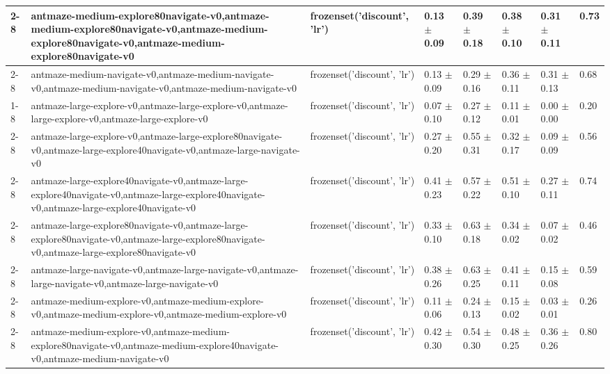 \begin{tabular}{llllllll}
\cline{2-8}
 & antmaze-medium-explore80navigate-v0,antmaze-medium-explore80navigate-v0,antmaze-medium-explore80navigate-v0,antmaze-medium-explore80navigate-v0 & frozenset({'discount', 'lr'}) & 0.13 $\pm$ 0.09 & 0.39 $\pm$ 0.18 & 0.38 $\pm$ 0.10 & 0.31 $\pm$ 0.11 & 0.73 \\
\cline{2-8}
 & antmaze-medium-navigate-v0,antmaze-medium-navigate-v0,antmaze-medium-navigate-v0,antmaze-medium-navigate-v0 & frozenset({'discount', 'lr'}) & 0.13 $\pm$ 0.09 & 0.29 $\pm$ 0.16 & 0.36 $\pm$ 0.11 & 0.31 $\pm$ 0.13 & 0.68 \\
\cline{1-8} \cline{2-8}
\multirow[t]{10}{*}{QRL} & antmaze-large-explore-v0,antmaze-large-explore-v0,antmaze-large-explore-v0,antmaze-large-explore-v0 & frozenset({'discount', 'lr'}) & 0.07 $\pm$ 0.10 & 0.27 $\pm$ 0.12 & 0.11 $\pm$ 0.01 & 0.00 $\pm$ 0.00 & 0.20 \\
\cline{2-8}
 & antmaze-large-explore-v0,antmaze-large-explore80navigate-v0,antmaze-large-explore40navigate-v0,antmaze-large-navigate-v0 & frozenset({'discount', 'lr'}) & 0.27 $\pm$ 0.20 & 0.55 $\pm$ 0.31 & 0.32 $\pm$ 0.17 & 0.09 $\pm$ 0.09 & 0.56 \\
\cline{2-8}
 & antmaze-large-explore40navigate-v0,antmaze-large-explore40navigate-v0,antmaze-large-explore40navigate-v0,antmaze-large-explore40navigate-v0 & frozenset({'discount', 'lr'}) & 0.41 $\pm$ 0.23 & 0.57 $\pm$ 0.22 & 0.51 $\pm$ 0.10 & 0.27 $\pm$ 0.11 & 0.74 \\
\cline{2-8}
 & antmaze-large-explore80navigate-v0,antmaze-large-explore80navigate-v0,antmaze-large-explore80navigate-v0,antmaze-large-explore80navigate-v0 & frozenset({'discount', 'lr'}) & 0.33 $\pm$ 0.10 & 0.63 $\pm$ 0.18 & 0.34 $\pm$ 0.02 & 0.07 $\pm$ 0.02 & 0.46 \\
\cline{2-8}
 & antmaze-large-navigate-v0,antmaze-large-navigate-v0,antmaze-large-navigate-v0,antmaze-large-navigate-v0 & frozenset({'discount', 'lr'}) & 0.38 $\pm$ 0.26 & 0.63 $\pm$ 0.25 & 0.41 $\pm$ 0.11 & 0.15 $\pm$ 0.08 & 0.59 \\
\cline{2-8}
 & antmaze-medium-explore-v0,antmaze-medium-explore-v0,antmaze-medium-explore-v0,antmaze-medium-explore-v0 & frozenset({'discount', 'lr'}) & 0.11 $\pm$ 0.06 & 0.24 $\pm$ 0.13 & 0.15 $\pm$ 0.02 & 0.03 $\pm$ 0.01 & 0.26 \\
\cline{2-8}
 & antmaze-medium-explore-v0,antmaze-medium-explore80navigate-v0,antmaze-medium-explore40navigate-v0,antmaze-medium-navigate-v0 & frozenset({'discount', 'lr'}) & 0.42 $\pm$ 0.30 & 0.54 $\pm$ 0.30 & 0.48 $\pm$ 0.25 & 0.36 $\pm$ 0.26 & 0.80 \\

\end{tabular}
